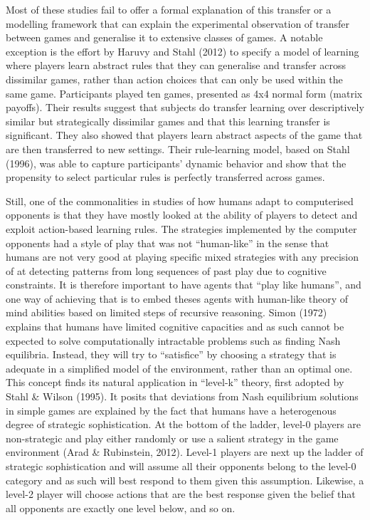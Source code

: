 \documentclass[man,floatsintext]{apa6}
\begin{document}
Most of these studies fail to offer a formal explanation of this transfer or a modelling framework that can explain the experimental observation of transfer between games and generalise it to extensive classes of games. A notable exception is the effort by Haruvy and Stahl (2012) to specify a model of learning where players learn abstract rules that they can generalise and transfer across dissimilar games, rather than action choices that can only be used within the same game. Participants played ten games, presented as 4x4 normal form (matrix payoffs). Their results suggest that subjects do transfer learning over descriptively similar but strategically dissimilar games and that this learning transfer is significant. They also showed that players learn abstract aspects of the game that are then transferred to new settings. Their rule-learning model, based on Stahl (1996), was able to capture participants' dynamic behavior and show that the propensity to select particular rules is perfectly transferred across games.

Still, one of the commonalities in studies of how humans adapt to computerised opponents is that they have mostly looked at the ability of players to detect and exploit action-based learning rules. The strategies implemented by the computer opponents had a style of play that was not \enquote{human-like} in the sense that humans are not very good at playing specific mixed strategies with any precision of at detecting patterns from long sequences of past play due to cognitive constraints. It is therefore important to have agents that \enquote{play like humans}, and one way of achieving that is to embed theses agents with human-like theory of mind abilities based on limited steps of recursive reasoning. Simon (1972) explains that humans have limited cognitive capacities and as such cannot be expected to solve computationally intractable problems such as finding Nash equilibria. Instead, they will try to \enquote{satisfice} by choosing a strategy that is adequate in a simplified model of the environment, rather than an optimal one. This concept finds its natural application in \enquote{level-k} theory, first adopted by Stahl \& Wilson (1995). It posits that deviations from Nash equilibrium solutions in simple games are explained by the fact that humans have a heterogenous degree of strategic sophistication. At the bottom of the ladder, level-0 players are non-strategic and play either randomly or use a salient strategy in the game environment (Arad \& Rubinstein, 2012). Level-1 players are next up the ladder of strategic sophistication and will assume all their opponents belong to the level-0 category and as such will best respond to them given this assumption. Likewise, a level-2 player will choose actions that are the best response given the belief that all opponents are exactly one level below, and so on.
\end{document}
